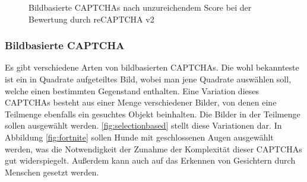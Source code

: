 \begin{figure}[h!]
    \centering
    \qquad
    \caption{Bildbasierte CAPTCHAs nach unzureichendem Score bei der Bewertung durch reCAPTCHA v2}   
    \label{fig:selectionbased}
\end{figure}

\subsubsection*{Bildbasierte CAPTCHA}
Es gibt verschiedene Arten von bildbasierten CAPTCHAs. 
Die wohl bekannteste ist ein in Quadrate aufgeteiltes Bild, wobei man jene Quadrate auswählen soll, welche einen bestimmten Gegenstand enthalten.
Eine Variation dieses CAPTCHAs besteht aus einer Menge verschiedener Bilder, von denen eine Teilmenge ebenfalls ein gesuchtes Objekt beinhalten. 
Die Bilder in der Teilmenge sollen ausgewählt werden. 
\autoref{fig:selectionbased} stellt diese Variationen dar.
In Abbildung \ref{fig:fortnite} sollen Hunde mit geschlossenen Augen ausgewählt werden,
was die Notwendigkeit der Zunahme der Komplexität dieser CAPTCHAs gut widerspiegelt. 
Außerdem kann auch auf das Erkennen von Gesichtern durch Menschen gesetzt werden.

